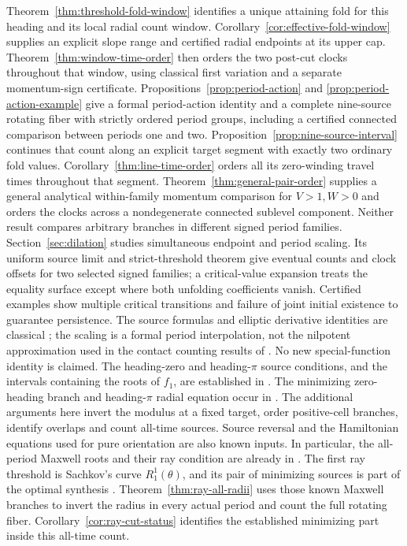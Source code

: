\documentclass[11pt,a4paper]{article}
\theoremstyle{remark}\newtheorem{remark}[theorem]{Remark}
\begin{document}
Theorem~\ref{thm:threshold-fold-window} identifies a unique attaining
fold for this heading and its local radial count window.
Corollary~\ref{cor:effective-fold-window} supplies an explicit slope
range and certified radial endpoints at its upper cap.
Theorem~\ref{thm:window-time-order} then orders the two post-cut clocks
throughout that window, using classical first variation and a separate
momentum-sign certificate. Propositions~\ref{prop:period-action} and
\ref{prop:period-action-example} give a formal period-action identity
and a complete nine-source rotating fiber with strictly ordered period
groups, including a certified connected comparison between periods one
and two. Proposition~\ref{prop:nine-source-interval} continues that count
along an explicit target segment with exactly two ordinary fold values.
Corollary~\ref{thm:line-time-order} orders all its zero-winding travel times
throughout that segment. Theorem~\ref{thm:general-pair-order} supplies a
general analytical within-family momentum comparison for $V>1,W>0$ and
orders the clocks across a nondegenerate connected sublevel component.
Neither result compares arbitrary branches in different signed period
families. Section~\ref{sec:dilation} studies simultaneous endpoint and
period scaling. Its uniform source limit and strict-threshold theorem
give eventual counts and clock offsets for two selected signed families;
a critical-value expansion treats the equality surface except where
both unfolding coefficients vanish. Certified examples show multiple
critical transitions and failure of joint initial existence to guarantee
persistence. The source formulas and elliptic derivative identities are
classical \cite{MS,SC,DLMF}; the scaling is a formal period interpolation,
not the nilpotent approximation used in the contact counting results
of \cite{LR}. No new special-function identity is claimed.
The heading-zero and heading-$\pi$ source
conditions, and the intervals containing the roots of $f_1$, are
established in \cite[Propositions 5.3--5.6 and Lemma 5.3]{MS}.
The minimizing zero-heading branch and heading-$\pi$ radial equation
occur in \cite[Lemmas 2.9--2.14]{SS}. The additional arguments here
invert the modulus at a fixed target, order positive-cell branches,
identify overlaps and count all-time sources. Source reversal and
the Hamiltonian equations used for pure orientation are also known
inputs.
In particular, the all-period Maxwell roots and their ray condition are
already in \cite[Lemma 5.3, Proposition 5.6 and Theorem 5.2]{MS}.
The first ray threshold is Sachkov's curve $R_1^1(\theta)$, and its
pair of minimizing sources is part of the optimal synthesis
\cite[Lemma 2.5, Table 2 and Theorems 3.1--3.3]{SS}.
Theorem~\ref{thm:ray-all-radii} uses those known Maxwell branches to
invert the radius in every actual period and count the full rotating
fiber. Corollary~\ref{cor:ray-cut-status} identifies the established
minimizing part inside this all-time count.
\end{document}
